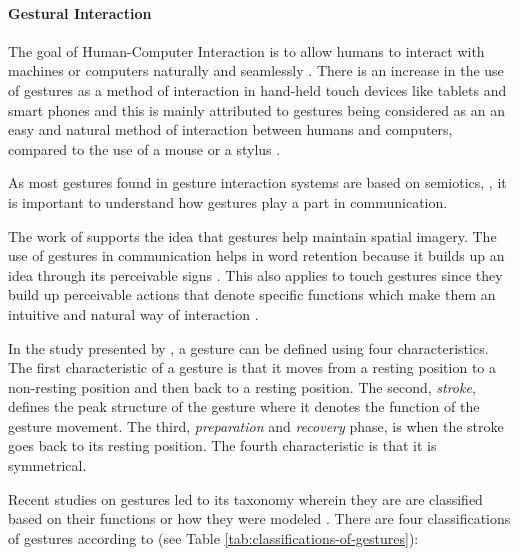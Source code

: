         
		\paragraph{Gestural Interaction}

The goal of Human-Computer Interaction is to allow humans to interact with machines or computers naturally and seamlessly \citep{hasan2012human}. There is an increase in the use of gestures as a method of interaction in hand-held touch devices like tablets and smart phones and this is mainly attributed to gestures being considered as an an easy and natural method of interaction between humans and computers, compared to the use of a mouse or a stylus \citep{kurtenbach1996gestures, pavlovic1997visual, hasan2012human}. 

As most gestures found in gesture interaction systems are based on semiotics, \citep{muntigl2004modelling,radford2009introduction, kammer2010towards}, it is important to understand how gestures play a part in communication.

The work of \citet{wesp2001gestures} supports the idea that gestures help maintain spatial imagery. The use of gestures in communication helps in word retention because it builds up an idea through its perceivable signs \citep{krauss1998why}. This also applies to touch gestures since they build up perceivable actions that denote specific functions which make them an intuitive and natural way of interaction \citep{rautaray2015vision}.

In the study presented by \citet{roth2001gestures}, a gesture can be defined using four characteristics. The first characteristic of a gesture is that it moves from a resting position to a non-resting position and then back to a resting position. The second, \textit{stroke}, defines the peak structure of the gesture where it denotes the function of the gesture movement. The third, \textit{preparation} and \textit{recovery} phase, is when the stroke goes back to its resting position. The fourth characteristic is that it is symmetrical.

Recent studies on gestures led to its taxonomy wherein they are are classified based on their functions or how they were modeled \citep{roth2001gestures}. There are four classifications of gestures according to \citet{mcneill2007hand} (see Table \ref{tab:classifications-of-gestures}):

